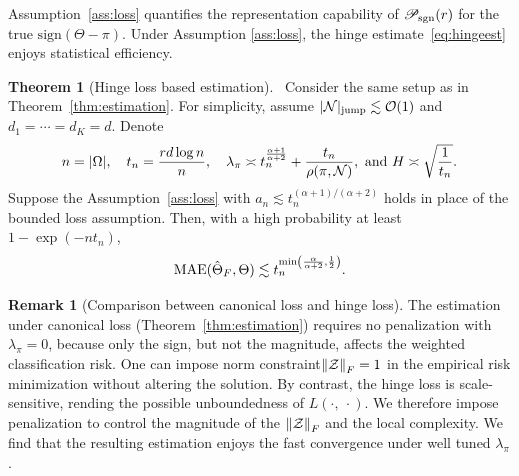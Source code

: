 \documentclass[twoside,11pt]{article}
\theoremstyle{definition}
\newtheorem{thm}{Theorem}
\newtheorem{rmk}{Remark}
\def\sign{\textup{sgn}}
\def\caliP{\mathscr{P}_{\textup{sgn}}}
\begin{document}
Assumption~\ref{ass:loss} quantifies the representation capability of $\caliP(r)$ for the true $\text{sign}(\Theta-\pi)$.  Under Assumption \ref{ass:loss}, the hinge estimate~\eqref{eq:hingeest} enjoys statistical efficiency. 
\begin{thm}[Hinge loss based estimation]~\label{thm:extension} 
Consider the same setup as in Theorem~\ref{thm:estimation}. For simplicity, assume $|\mathcal{N}|_{\text{jump}}\lesssim \mathcal{O}(1)$ and $d_1=\cdots=d_K=d$. Denote
\[
n=|\Omega|, \quad t_n={ r d \log n \over n}, \quad \lambda_\pi\asymp t_n^{\alpha+1\over \alpha+2}+{t_n\over\rho(\pi,\mathcal{N})}, \ \text{and}\ H\asymp \sqrt{1\over t_n}.
\]
Suppose the Assumption~\ref{ass:loss} with $a_n \lesssim t_n^{(\alpha+1)/(\alpha+2)}$ holds in place of the bounded loss assumption. Then, with a high probability at least $1-\exp(-nt_n)$,
\begin{equation}\label{eq:rfs}
\textup{MAE}(\hat\Theta_F,\Theta) \lesssim t_n^{\min\left( {\alpha\over \alpha+2},{1\over 2}\right)}.
\end{equation}
\end{thm}
\begin{rmk}[Comparison between canonical loss and hinge loss] The estimation under canonical loss (Theorem~\ref{thm:estimation}) requires no penalization with $\lambda_\pi=0$, because only the sign, but not the magnitude, affects the weighted classification risk. One can impose norm constraint$\left\lVert\mathcal{Z}\right\rVert_F=1$ in the empirical risk minimization without altering the solution. By contrast, the hinge loss is scale-sensitive, rending the possible unboundedness of $L(\cdot,\ \cdot)$. We therefore impose penalization to control the magnitude of the $\left\lVert\mathcal{Z}\right\rVert_F$ and the local complexity. We find that the resulting estimation enjoys the fast convergence under well tuned $\lambda_\pi$.
\end{rmk}
\end{document}
